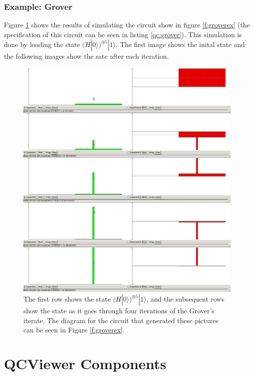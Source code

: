 \documentclass[10pt]{article}
\theoremstyle{definition}
\begin{document}
\subsubsection{Example: Grover}

Figure \ref{f:simulate} shows the results of simulating the circuit show in figure \ref{f:groverex} 
(the specification of this circuit can be seen in listing \ref{qc:grover}).  This simulation is done by loading
the state $(H|0\rangle)^{\otimes 5}|1\rangle$.  The first image shows the inital state and the following images 
show the sate after each iteration.

\begin{figure}
\capstart
\centering
\includegraphics[scale=.35]{Figures/simulate}
\caption{The first row shows the state $(H|0\rangle)^{\otimes 5}|1\rangle$, 
and the subsequent rows show the state as it goes through four iterations of the Grover's iterate. The
diagram for the circuit that generated these pictures can be seen in Figure \ref{f:groverex}.}
\label{f:simulate}
\end{figure}

\section{QCViewer Components}\label{sec:QCViewerComponents}
\end{document}
